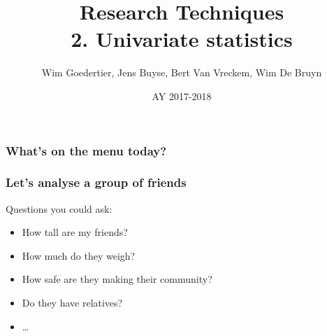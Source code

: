 \documentclass{beamer}
\title[Univariate statistics]{Research Techniques\\2. Univariate statistics}
\author{Wim Goedertier, Jens Buyse, Bert {Van Vreckem}, Wim {De Bruyn}}
\date{AY 2017-2018}
\begin{document}

\HoGentLogo

\titleframe


\begin{frame}
  \frametitle{What's on the menu today?}

  \tableofcontents
\end{frame}

\begin{frame}
  \frametitle{Let's analyse a group of friends}

  Questions you could ask:

  \begin{itemize}
    \item How tall are my friends?
    \item How much do they weigh?
    \item How safe are they making their community?
    \item Do they have relatives?
    \item \ldots
  \end{itemize}
\end{frame}
\end{document}
